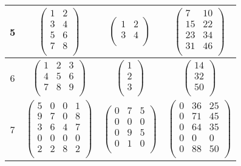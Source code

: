 \begin{table}[H]
\begin{center}
\begin{tabular}{|c | c | c| c |}
			5 & $\begin{pmatrix}
				1 & 2 \\
				3 &4\\
				5& 6\\
				7 & 8 \\
			\end{pmatrix}$ & $\begin{pmatrix}
				1& 2\\
				3& 4\\
			\end{pmatrix}$ &$\begin{pmatrix}
				7&10\\
				15&22\\
				23&34\\
				31&46\\
			\end{pmatrix}$ \\ \hline
		
			6 & $\begin{pmatrix}
				1 & 2& 3\\
				4& 5&6 \\
				7&8&9\\
			\end{pmatrix}$ & $\begin{pmatrix}
				1\\
				2\\
				3\\
			\end{pmatrix}$ &$\begin{pmatrix}
				14\\
				32\\
				50\\
			\end{pmatrix}$ \\ \hline
		
			7 & $\begin{pmatrix}
				5& 0& 0& 1\\
				9& 7& 0& 8\\
				3& 6& 4& 7\\
				0& 0& 0& 0\\
				2& 2& 8& 2\\
			\end{pmatrix}$ & $\begin{pmatrix}
				0& 7& 5\\
				0& 0& 0\\
				0& 9& 5\\
				0& 1& 0\\
			\end{pmatrix}$ &$\begin{pmatrix}
				0& 36& 25\\
				0& 71& 45\\
				0& 64& 35\\
				0& 0& 0\\
				0& 88& 50\\
			\end{pmatrix}$ \\ \hline

			
		\end{tabular}
	\end{center}
\end{table}

\newpage